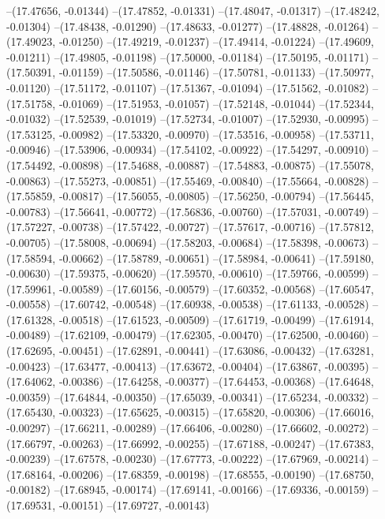 --(17.47656, -0.01344)
--(17.47852, -0.01331)
--(17.48047, -0.01317)
--(17.48242, -0.01304)
--(17.48438, -0.01290)
--(17.48633, -0.01277)
--(17.48828, -0.01264)
--(17.49023, -0.01250)
--(17.49219, -0.01237)
--(17.49414, -0.01224)
--(17.49609, -0.01211)
--(17.49805, -0.01198)
--(17.50000, -0.01184)
--(17.50195, -0.01171)
--(17.50391, -0.01159)
--(17.50586, -0.01146)
--(17.50781, -0.01133)
--(17.50977, -0.01120)
--(17.51172, -0.01107)
--(17.51367, -0.01094)
--(17.51562, -0.01082)
--(17.51758, -0.01069)
--(17.51953, -0.01057)
--(17.52148, -0.01044)
--(17.52344, -0.01032)
--(17.52539, -0.01019)
--(17.52734, -0.01007)
--(17.52930, -0.00995)
--(17.53125, -0.00982)
--(17.53320, -0.00970)
--(17.53516, -0.00958)
--(17.53711, -0.00946)
--(17.53906, -0.00934)
--(17.54102, -0.00922)
--(17.54297, -0.00910)
--(17.54492, -0.00898)
--(17.54688, -0.00887)
--(17.54883, -0.00875)
--(17.55078, -0.00863)
--(17.55273, -0.00851)
--(17.55469, -0.00840)
--(17.55664, -0.00828)
--(17.55859, -0.00817)
--(17.56055, -0.00805)
--(17.56250, -0.00794)
--(17.56445, -0.00783)
--(17.56641, -0.00772)
--(17.56836, -0.00760)
--(17.57031, -0.00749)
--(17.57227, -0.00738)
--(17.57422, -0.00727)
--(17.57617, -0.00716)
--(17.57812, -0.00705)
--(17.58008, -0.00694)
--(17.58203, -0.00684)
--(17.58398, -0.00673)
--(17.58594, -0.00662)
--(17.58789, -0.00651)
--(17.58984, -0.00641)
--(17.59180, -0.00630)
--(17.59375, -0.00620)
--(17.59570, -0.00610)
--(17.59766, -0.00599)
--(17.59961, -0.00589)
--(17.60156, -0.00579)
--(17.60352, -0.00568)
--(17.60547, -0.00558)
--(17.60742, -0.00548)
--(17.60938, -0.00538)
--(17.61133, -0.00528)
--(17.61328, -0.00518)
--(17.61523, -0.00509)
--(17.61719, -0.00499)
--(17.61914, -0.00489)
--(17.62109, -0.00479)
--(17.62305, -0.00470)
--(17.62500, -0.00460)
--(17.62695, -0.00451)
--(17.62891, -0.00441)
--(17.63086, -0.00432)
--(17.63281, -0.00423)
--(17.63477, -0.00413)
--(17.63672, -0.00404)
--(17.63867, -0.00395)
--(17.64062, -0.00386)
--(17.64258, -0.00377)
--(17.64453, -0.00368)
--(17.64648, -0.00359)
--(17.64844, -0.00350)
--(17.65039, -0.00341)
--(17.65234, -0.00332)
--(17.65430, -0.00323)
--(17.65625, -0.00315)
--(17.65820, -0.00306)
--(17.66016, -0.00297)
--(17.66211, -0.00289)
--(17.66406, -0.00280)
--(17.66602, -0.00272)
--(17.66797, -0.00263)
--(17.66992, -0.00255)
--(17.67188, -0.00247)
--(17.67383, -0.00239)
--(17.67578, -0.00230)
--(17.67773, -0.00222)
--(17.67969, -0.00214)
--(17.68164, -0.00206)
--(17.68359, -0.00198)
--(17.68555, -0.00190)
--(17.68750, -0.00182)
--(17.68945, -0.00174)
--(17.69141, -0.00166)
--(17.69336, -0.00159)
--(17.69531, -0.00151)
--(17.69727, -0.00143)
